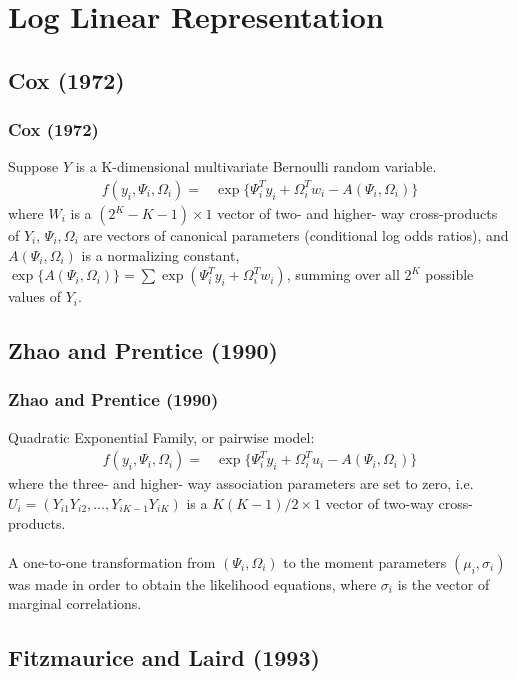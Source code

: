 \documentclass[]{beamer}
\begin{document}
\section{Log Linear Representation}

\subsection{Cox (1972)}
\begin{frame}
  \frametitle{Cox (1972)}   %
Suppose $Y$ is a K-dimensional multivariate Bernoulli random variable.
\begin{align}
f(y_i, \Psi_i, \Omega_i) = & \exp \{\Psi_i^T y_i + \Omega_i^T w_i - A(\Psi_i,\Omega_i)\}
\end{align}
where $W_i$ is a $(2^K - K - 1) \times 1$ vector of two- and  higher- way cross-products of $Y_i$, $\Psi_i, \Omega_i$ are vectors of canonical parameters (conditional log odds ratios), and $A(\Psi_i,\Omega_i)$ is a normalizing constant, $\exp \{A(\Psi_i,\Omega_i)\} = \sum \exp (\Psi_i^T y_i + \Omega_i^T w_i)$, summing over all $2^K$ possible values of $Y_i$.
\end{frame}

\subsection{Zhao and Prentice (1990)}
\begin{frame}
  \frametitle{Zhao and Prentice (1990)}   %

Quadratic Exponential Family, or pairwise model:
\begin{align}
f(y_i, \Psi_i, \Omega_i) = & \exp \{\Psi_i^T y_i + \Omega_i^{T} u_i - A(\Psi_i,\Omega_i)\}
\end{align}
where the three- and higher- way association parameters are set to zero, i.e.
$U_i = (Y_{i1}Y_{i2}, \ldots, Y_{iK-1}Y_{iK})$ is a $K(K-1)/2 \times 1$ vector of two-way cross-products.\\
\ \\
A one-to-one transformation from $(\Psi_i, \Omega_i)$ to the moment parameters $(\mu_i,\sigma_i)$ was made in order to obtain the likelihood equations, where $\sigma_i$ is the vector of marginal correlations.
\end{frame}


\subsection{Fitzmaurice and Laird (1993)}
\end{document}

